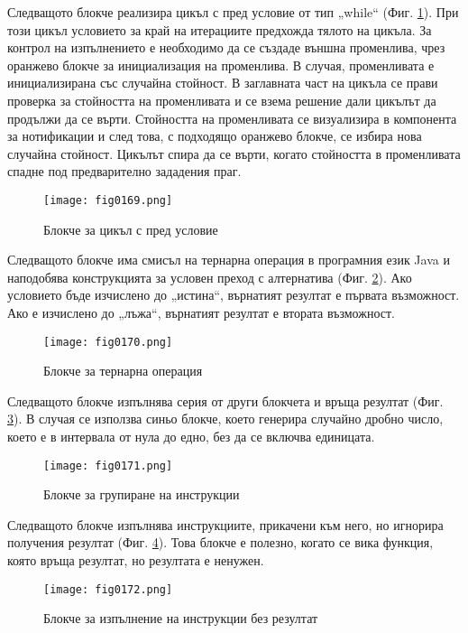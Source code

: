 Следващото блокче реализира цикъл с пред условие от тип „while“ (Фиг. \ref{fig0169}). При този цикъл условието за край на итерациите предхожда тялото на цикъла. За контрол на изпълнението е необходимо да се създаде външна променлива, чрез оранжево блокче за инициализация на променлива. В случая, променливата е инициализирана със случайна стойност. В заглавната част на цикъла се прави проверка за стойността на променливата и се взема решение дали цикълът да продължи да се върти. Стойността на променливата се визуализира в компонента за нотификации и след това, с подходящо оранжево блокче, се избира нова случайна стойност. Цикълът спира да се върти, когато стойността в променливата спадне под предварително зададения праг. 

\begin{figure}[H]
  \centering
  \texttt{[image: fig0169.png]}
  \caption{Блокче за цикъл с пред условие}
\label{fig0169}
\end{figure}

Следващото блокче има смисъл на тернарна операция в програмния език Java и наподобява конструкцията за условен преход с алтернатива (Фиг. \ref{fig0170}). Ако условието бъде изчислено до „истина“, върнатият резултат е първата възможност. Ако е изчислено до „лъжа“, върнатият резултат е втората възможност. 

\begin{figure}[H]
  \centering
  \texttt{[image: fig0170.png]}
  \caption{Блокче за тернарна операция}
\label{fig0170}
\end{figure}

Следващото блокче изпълнява серия от други блокчета и връща резултат (Фиг. \ref{fig0171}). В случая се използва синьо блокче, което генерира случайно дробно число, което е в интервала от нула до едно, без да се включва единицата. 

\begin{figure}[H]
  \centering
  \texttt{[image: fig0171.png]}
  \caption{Блокче за групиране на инструкции}
\label{fig0171}
\end{figure}

Следващото блокче изпълнява инструкциите, прикачени към него, но игнорира получения резултат (Фиг. \ref{fig0172}). Това блокче е полезно, когато се вика функция, която връща резултат, но резултата е ненужен.

\begin{figure}[H]
  \centering
  \texttt{[image: fig0172.png]}
  \caption{Блокче за изпълнение на инструкции без резултат}
\label{fig0172}
\end{figure}

